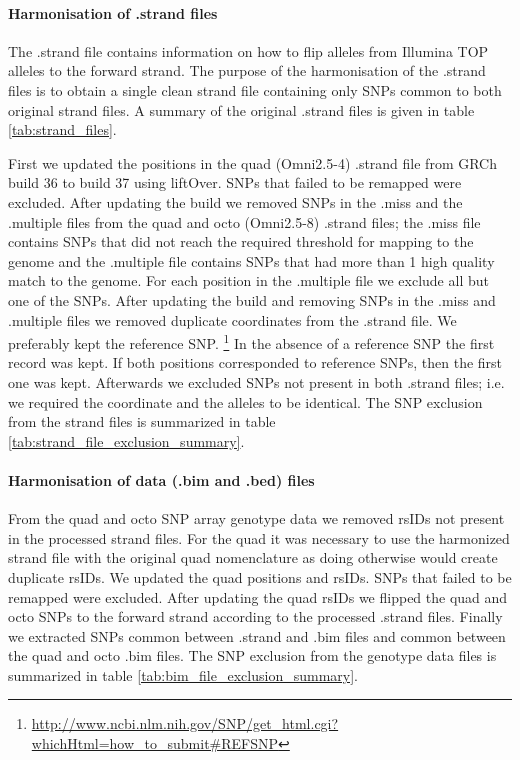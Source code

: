 \paragraph{Harmonisation of .strand files}
The .strand file contains information on how to flip alleles from Illumina TOP alleles to the forward strand. The purpose of the harmonisation of the .strand files is to obtain a single clean strand file containing only SNPs common to both original strand files. A summary of the original .strand files is given in table \ref{tab:strand_files}.


First we updated the positions in the quad (Omni2.5-4) .strand file from \gls{GRCh}\cite{10.1371/journal.pbio.1001091} build 36 to build 37 using liftOver.\cite{Karolchik01012014} SNPs that failed to be remapped were excluded. After updating the build we removed \glspl{SNP} in the .miss and the .multiple files from the quad and octo (Omni2.5-8) .strand files; the .miss file contains \glspl{SNP} that did not reach the required threshold for mapping to the genome and the .multiple file contains \glspl{SNP} that had more than 1 high quality match to the genome. For each position in the .multiple file we exclude all but one of the \glspl{SNP}.
After updating the build and removing \glspl{SNP} in the .miss and .multiple files we removed duplicate coordinates from the .strand file. We preferably kept the reference \gls{SNP}.
\footnote{\url{http://www.ncbi.nlm.nih.gov/SNP/get_html.cgi?whichHtml=how_to_submit\#REFSNP}} In the absence of a reference SNP the first record was kept. If both positions corresponded to reference SNPs, then the first one was kept.
Afterwards we excluded \glspl{SNP} not present in both .strand files; i.e. we required the coordinate and the alleles to be identical. The SNP exclusion from the strand files is summarized in table \ref{tab:strand_file_exclusion_summary}.


\paragraph{Harmonisation of data (.bim and .bed) files}
From the quad and octo \gls{SNP} array genotype data we removed rsIDs not present in the processed strand files. For the quad it was necessary to use the harmonized strand file with the original quad nomenclature as doing otherwise would create duplicate rsIDs. We updated the quad positions and rsIDs. SNPs that failed to be remapped were excluded. After updating the quad rsIDs we flipped the quad and octo \glspl{SNP} to the forward strand according to the processed .strand files. Finally we extracted \glspl{SNP} common between .strand and .bim files and common between the quad and octo .bim files. The SNP exclusion from the genotype data files is summarized in table \ref{tab:bim_file_exclusion_summary}.


